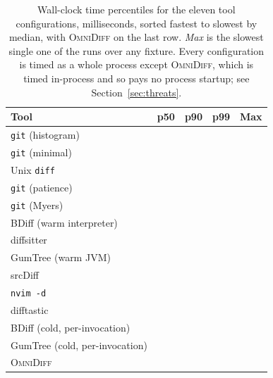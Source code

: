 \documentclass[sigconf]{acmart}
\begin{document}
\begin{table}
  \caption{Wall-clock time percentiles for the eleven tool configurations, milliseconds, sorted
  fastest to slowest by median, with \textsc{OmniDiff} on the last row. \emph{Max} is the slowest
  single one of the \TimingRepeats{} runs over any fixture. Every configuration is timed as a whole
  process except \textsc{OmniDiff}, which is timed in-process and so pays no process startup; see
  Section~\ref{sec:threats}.}
  \label{tab:speed-vs-others}
  \small
  \begin{tabular}{lrrrr}
    \toprule
    Tool & p50 & p90 & p99 & Max \\
    \midrule
    \texttt{git} (histogram) & \SpeedGitHistogramPFifty{} & \SpeedGitHistogramPNinety{} & \SpeedGitHistogramPNinetyNine{} & \SpeedGitHistogramMax{} \\
    \texttt{git} (minimal) & \SpeedGitMinimalPFifty{} & \SpeedGitMinimalPNinety{} & \SpeedGitMinimalPNinetyNine{} & \SpeedGitMinimalMax{} \\
    Unix \texttt{diff} & \SpeedUnixDiffPFifty{} & \SpeedUnixDiffPNinety{} & \SpeedUnixDiffPNinetyNine{} & \SpeedUnixDiffMax{} \\
    \texttt{git} (patience) & \SpeedGitPatiencePFifty{} & \SpeedGitPatiencePNinety{} & \SpeedGitPatiencePNinetyNine{} & \SpeedGitPatienceMax{} \\
    \texttt{git} (Myers) & \SpeedGitMyersPFifty{} & \SpeedGitMyersPNinety{} & \SpeedGitMyersPNinetyNine{} & \SpeedGitMyersMax{} \\
    BDiff (warm interpreter) & \SpeedBDiffWarmPFifty{} & \SpeedBDiffWarmPNinety{} & \SpeedBDiffWarmPNinetyNine{} & \SpeedBDiffWarmMax{} \\
    diffsitter & \SpeedDiffsitterPFifty{} & \SpeedDiffsitterPNinety{} & \SpeedDiffsitterPNinetyNine{} & \SpeedDiffsitterMax{} \\
    GumTree (warm JVM) & \SpeedGumTreeWarmPFifty{} & \SpeedGumTreeWarmPNinety{} & \SpeedGumTreeWarmPNinetyNine{} & \SpeedGumTreeWarmMax{} \\
    srcDiff & \SpeedSrcDiffPFifty{} & \SpeedSrcDiffPNinety{} & \SpeedSrcDiffPNinetyNine{} & \SpeedSrcDiffMax{} \\
    \texttt{nvim -d} & \SpeedNvimDiffPFifty{} & \SpeedNvimDiffPNinety{} & \SpeedNvimDiffPNinetyNine{} & \SpeedNvimDiffMax{} \\
    difftastic & \SpeedDifftasticPFifty{} & \SpeedDifftasticPNinety{} & \SpeedDifftasticPNinetyNine{} & \SpeedDifftasticMax{} \\
    BDiff (cold, per-invocation) & \SpeedBDiffColdPFifty{} & \SpeedBDiffColdPNinety{} & \SpeedBDiffColdPNinetyNine{} & \SpeedBDiffColdMax{} \\
    GumTree (cold, per-invocation) & \SpeedGumTreeColdPFifty{} & \SpeedGumTreeColdPNinety{} & \SpeedGumTreeColdPNinetyNine{} & \SpeedGumTreeColdMax{} \\
    \midrule
    \textsc{OmniDiff} & \SpeedOmniDiffPFifty{} & \SpeedOmniDiffPNinety{} & \SpeedOmniDiffPNinetyNine{} & \SpeedOmniDiffMax{} \\
    \bottomrule
  \end{tabular}
\end{table}
\end{document}

